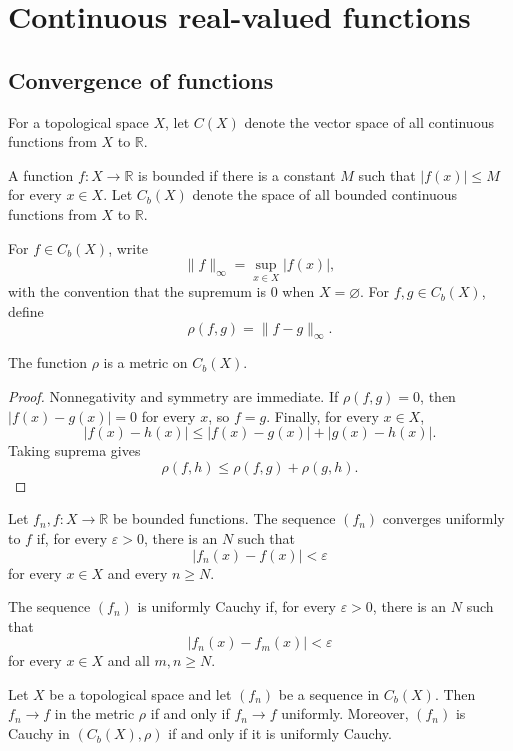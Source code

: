 \section{Continuous real-valued functions}

\subsection{Convergence of functions}

\begin{de}
For a topological space $X$, let $C(X)$ denote the vector space of all
continuous functions from $X$ to $\mathbb{R}$.

A function $f:X\to\mathbb{R}$ is bounded if there is a constant $M$ such that
$|f(x)|\leq M$ for every $x\in X$. Let $C_b(X)$ denote the space of all
bounded continuous functions from $X$ to $\mathbb{R}$.

For $f\in C_b(X)$, write
\[
\|f\|_\infty=\sup_{x\in X}|f(x)|,
\]
with the convention that the supremum is $0$ when $X=\varnothing$. For
$f,g\in C_b(X)$, define
\[
\rho(f,g)=\|f-g\|_\infty.
\]
\end{de}

\begin{thm}
The function $\rho$ is a metric on $C_b(X)$.
\end{thm}

\begin{proof}
Nonnegativity and symmetry are immediate. If $\rho(f,g)=0$, then
$|f(x)-g(x)|=0$ for every $x$, so $f=g$. Finally, for every $x\in X$,
\[
|f(x)-h(x)|\leq |f(x)-g(x)|+|g(x)-h(x)|.
\]
Taking suprema gives
\[
\rho(f,h)\leq \rho(f,g)+\rho(g,h).
\]
\end{proof}

\begin{de}
Let $f_n,f:X\to\mathbb{R}$ be bounded functions. The sequence $(f_n)$
converges uniformly to $f$ if, for every $\varepsilon>0$, there is an $N$ such
that
\[
|f_n(x)-f(x)|<\varepsilon
\]
for every $x\in X$ and every $n\geq N$.

The sequence $(f_n)$ is uniformly Cauchy if, for every $\varepsilon>0$, there
is an $N$ such that
\[
|f_n(x)-f_m(x)|<\varepsilon
\]
for every $x\in X$ and all $m,n\geq N$.
\end{de}

\begin{thm}
Let $X$ be a topological space and let $(f_n)$ be a sequence in $C_b(X)$.
Then $f_n\to f$ in the metric $\rho$ if and only if $f_n\to f$ uniformly.
Moreover, $(f_n)$ is Cauchy in $(C_b(X),\rho)$ if and only if it is uniformly
Cauchy.
\end{thm}

